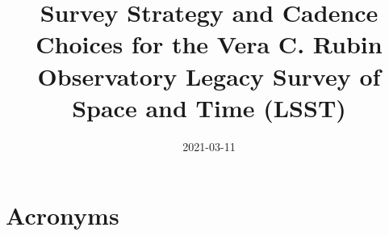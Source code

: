\documentclass[modern]{aastex7}
\begin{document}


\date{2021-03-11}
\title{Survey Strategy and Cadence Choices for the Vera C. Rubin Observatory Legacy Survey of Space and Time (LSST)}


\tableofcontents

\clearpage


\clearpage

\clearpage

\clearpage

\clearpage

\clearpage

\clearpage


%

\clearpage



\clearpage
\section{Acronyms} \label{sec:acronyms}

\end{document}
